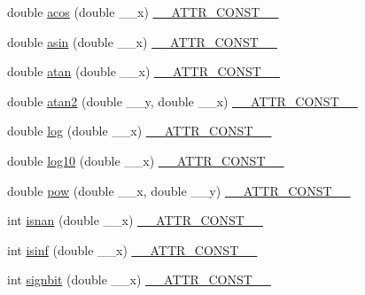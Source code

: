 \begin{DoxyCompactItemize}
\item 
double \hyperlink{group__avr__math_gaa3a144378cb5470be25699ce14b5998b}{acos} (double \+\_\+\+\_\+x) \hyperlink{group__avr__math_ga87f6b1b3880d945610873b9da382e5d4}{\+\_\+\+\_\+\+A\+T\+T\+R\+\_\+\+C\+O\+N\+S\+T\+\_\+\+\_\+}
\item 
double \hyperlink{group__avr__math_ga3d13e59a7e1b64fc5427ed1164356866}{asin} (double \+\_\+\+\_\+x) \hyperlink{group__avr__math_ga87f6b1b3880d945610873b9da382e5d4}{\+\_\+\+\_\+\+A\+T\+T\+R\+\_\+\+C\+O\+N\+S\+T\+\_\+\+\_\+}
\item 
double \hyperlink{group__avr__math_ga91781e24e088dac3595e3fee50fcfb6d}{atan} (double \+\_\+\+\_\+x) \hyperlink{group__avr__math_ga87f6b1b3880d945610873b9da382e5d4}{\+\_\+\+\_\+\+A\+T\+T\+R\+\_\+\+C\+O\+N\+S\+T\+\_\+\+\_\+}
\item 
double \hyperlink{group__avr__math_ga1282adc3f67ff1b7ed9bdeef3e7b1ab6}{atan2} (double \+\_\+\+\_\+y, double \+\_\+\+\_\+x) \hyperlink{group__avr__math_ga87f6b1b3880d945610873b9da382e5d4}{\+\_\+\+\_\+\+A\+T\+T\+R\+\_\+\+C\+O\+N\+S\+T\+\_\+\+\_\+}
\item 
double \hyperlink{group__avr__math_ga54ae98f13814deb08e40335a339b6efe}{log} (double \+\_\+\+\_\+x) \hyperlink{group__avr__math_ga87f6b1b3880d945610873b9da382e5d4}{\+\_\+\+\_\+\+A\+T\+T\+R\+\_\+\+C\+O\+N\+S\+T\+\_\+\+\_\+}
\item 
double \hyperlink{group__avr__math_ga89c64ad3ffb4900c806fb6827c30ed1d}{log10} (double \+\_\+\+\_\+x) \hyperlink{group__avr__math_ga87f6b1b3880d945610873b9da382e5d4}{\+\_\+\+\_\+\+A\+T\+T\+R\+\_\+\+C\+O\+N\+S\+T\+\_\+\+\_\+}
\item 
double \hyperlink{group__avr__math_gaa9a9885e972736204c941a7e9db0ffe2}{pow} (double \+\_\+\+\_\+x, double \+\_\+\+\_\+y) \hyperlink{group__avr__math_ga87f6b1b3880d945610873b9da382e5d4}{\+\_\+\+\_\+\+A\+T\+T\+R\+\_\+\+C\+O\+N\+S\+T\+\_\+\+\_\+}
\item 
int \hyperlink{group__avr__math_gafa5b3d99af3bf027f5742e5c0e6b7095}{isnan} (double \+\_\+\+\_\+x) \hyperlink{group__avr__math_ga87f6b1b3880d945610873b9da382e5d4}{\+\_\+\+\_\+\+A\+T\+T\+R\+\_\+\+C\+O\+N\+S\+T\+\_\+\+\_\+}
\item 
int \hyperlink{group__avr__math_ga7958c6f2498eaf51798f80de9fcfe9d0}{isinf} (double \+\_\+\+\_\+x) \hyperlink{group__avr__math_ga87f6b1b3880d945610873b9da382e5d4}{\+\_\+\+\_\+\+A\+T\+T\+R\+\_\+\+C\+O\+N\+S\+T\+\_\+\+\_\+}
\item 
int \hyperlink{group__avr__math_ga630a57ee687f001f8e5a218c9b79f50b}{signbit} (double \+\_\+\+\_\+x) \hyperlink{group__avr__math_ga87f6b1b3880d945610873b9da382e5d4}{\+\_\+\+\_\+\+A\+T\+T\+R\+\_\+\+C\+O\+N\+S\+T\+\_\+\+\_\+}

\end{DoxyCompactItemize}

